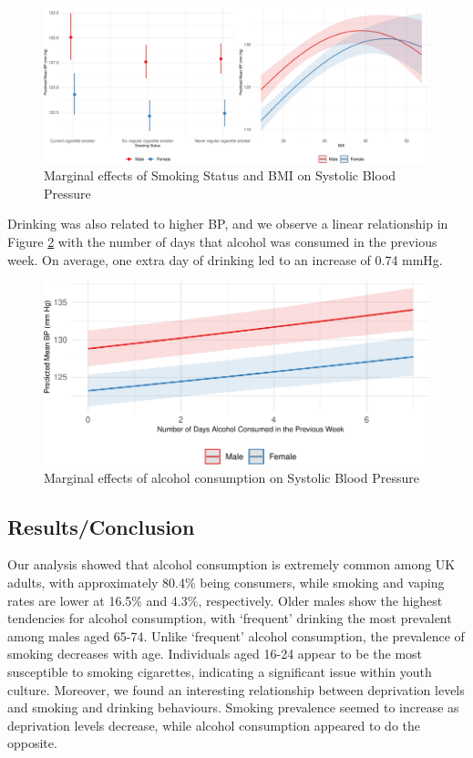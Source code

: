 \documentclass[
  11pt,
  twocolumn]{article}
\begin{document}
\begin{figure}[H]
\includegraphics{Coursework_files/figure-latex/output-effect-plots-1} \caption{Marginal effects of Smoking Status and BMI on Systolic Blood Pressure}\label{fig:output-effect-plots}
\end{figure}

Drinking was also related to higher BP, and we observe a linear
relationship in Figure \ref{fig:output-effect-plots-alc} with the number
of days that alcohol was consumed in the previous week. On average, one
extra day of drinking led to an increase of 0.74 mmHg.

\begin{figure}[H]
\includegraphics{Coursework_files/figure-latex/output-effect-plots-alc-1} \caption{Marginal effects of alcohol consumption on Systolic Blood Pressure}\label{fig:output-effect-plots-alc}
\end{figure}

\subsection{Results/Conclusion}\label{resultsconclusion}

Our analysis showed that alcohol consumption is extremely common among
UK adults, with approximately 80.4\% being consumers, while smoking and
vaping rates are lower at 16.5\% and 4.3\%, respectively. Older males
show the highest tendencies for alcohol consumption, with `frequent'
drinking the most prevalent among males aged 65-74. Unlike `frequent'
alcohol consumption, the prevalence of smoking decreases with age.
Individuals aged 16-24 appear to be the most susceptible to smoking
cigarettes, indicating a significant issue within youth culture.
Moreover, we found an interesting relationship between deprivation
levels and smoking and drinking behaviours. Smoking prevalence seemed to
increase as deprivation levels decrease, while alcohol consumption
appeared to do the opposite.
\end{document}
